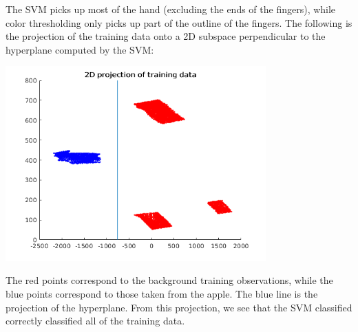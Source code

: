 \documentclass[letterpaper,12pt]{article}
\begin{document}
\begin{enumerate}
\begin{center}
  \end{center}
  The SVM picks up most of the hand (excluding the ends of the
  fingers), while color thresholding only picks up part of the outline
  of the fingers. The following is the projection of the training data
  onto a 2D subspace perpendicular to the hyperplane computed by the
  SVM:
  \begin{center}
    \includegraphics[width=10cm]{hand_proj.png}
  \end{center}
  The red points correspond to the background training observations,
  while the blue points correspond to those taken from the apple. The
  blue line is the projection of the hyperplane. From this projection,
  we see that the SVM classified correctly classified all of the
  training data.


\end{enumerate}
\end{document}
